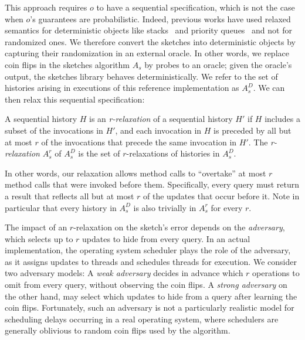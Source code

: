 This approach requires $o$ to have a sequential specification, which is not the case when $o$'s guarantees 
are probabilistic.
Indeed, previous works have used relaxed semantics for deterministic objects like stacks~\cite{Henzinger} and priority 
queues~\cite{alistarh} and not for randomized ones. 
We therefore convert the sketches into deterministic objects by capturing their randomization in an external oracle. 
In other words, we replace coin flips in the sketches algorithm $A_s$ by probes to an oracle;  given the oracle's output, 
the sketches library behaves deterministically. We refer to 
the set of histories arising in executions of this reference implementation as  $A_s^D$.
We can then relax this sequential specification: 

\begin{definition}[r-relaxation]
A sequential history $H$ is an \emph{r-relaxation} of a sequential history $H'$ if $H$ includes a subset of the 
invocations in $H'$, and each invocation in $H$ is preceded by all but at most $r$ of the invocations that precede the 
same invocation in $H'$.  The \emph{r-relaxation}  $A_s^r$ of  $A_s^D$ is the set of $r$-relaxations of 
histories in $A_s^D$.  
\end{definition}
In other words, our relaxation allows method calls to ``overtake'' at most $r$ method calls that were invoked before them.
Specifically, every query must return a result that reflects all but at most $r$ of the updates that occur before it. 
Note in particular that every history in  $A_s^D$ is also trivially in  $A_s^r$ for every $r$.

The impact of an $r$-relaxation on the sketch's error depends on the \emph{adversary}, which selects up to 
$r$ updates to hide from every query. In an actual implementation, the operating system scheduler plays the role of the adversary,
as it assigns updates to threads and schedules threads for execution.
We consider two adversary models:   
A \emph{weak adversary}  decides in advance which $r$ operations to omit from 
every query, without observing the coin flips. 
A \emph{strong adversary}  on the other hand, may select which updates to hide from a query after learning 
the coin flips.  Fortunately, 
such an adversary is not a particularly realistic model for scheduling delays occurring in a real operating system,
where schedulers are generally oblivious to random coin flips used by the algorithm.

